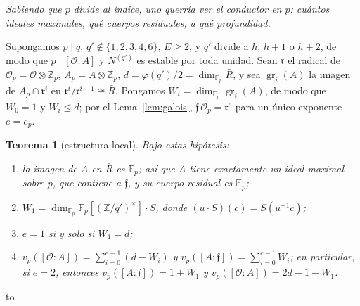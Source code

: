 \documentclass[11pt,a4paper]{article}
\newtheorem{theorem}{Teorema}
\theoremstyle{definition}
\newcommand{\ZZ}{\mathbb{Z}}
\newcommand{\FF}{\mathbb{F}}
\newcommand{\cO}{\mathcal{O}}
\newcommand{\cf}{\mathfrak{f}}
\newcommand{\rad}{\mathfrak{r}}
\newcommand{\gr}{\operatorname{gr}}
\newcommand{\pregunta}[1]{\par\smallskip\noindent\emph{#1}\par\smallskip}
\newenvironment{keybox}
  {\par\vspace{9pt}\begin{lrbox}{\fichabox}%
   \begin{minipage}{0.90\textwidth}\vspace{7pt}\setlength{\parskip}{3pt}}
  {\vspace{7pt}\end{minipage}\end{lrbox}%
   \par\needspace{\dimexpr\ht\fichabox+\dp\fichabox+12pt\relax}\noindent\hbox to \textwidth{\hfill
   \textcolor{azul}{\rule[-\dp\fichabox]{3.2pt}{\dimexpr\ht\fichabox+\dp\fichabox\relax}}%
   \colorbox{fondoficha}{\usebox{\fichabox}}\hfill}%
   \par\vspace{9pt}}
\begin{document}
\pregunta{Sabiendo que $p$ divide al índice, uno querría ver el conductor en $p$: cuántos ideales maximales, qué
cuerpos residuales, a qué profundidad.}

\noindent Supongamos $p\mid q$, $q'\notin\{1,2,3,4,6\}$, $E\ge2$, y $q'$ divide a $h$, $h+1$ o $h+2$, de modo que $p\mid[\cO:A]$ y
$N^{(q')}$ es estable por toda unidad. Sean $\rad$ el radical de $\cO_p=\cO\otimes\ZZ_p$, $A_p=A\otimes\ZZ_p$,
$d=\varphi(q')/2=\dim_{\FF_p}\bar R$, y sea $\gr_i(A)$ la imagen de $A_p\cap\rad^i$ en
$\rad^i/\rad^{i+1}\cong\bar R$. Pongamos $W_i=\dim_{\FF_p}\gr_i(A)$, de modo que $W_0=1$ y $W_i\le d$; por el
Lema~\ref{lem:galois}, $\cf\,\cO_p=\rad^{e}$ para un único exponente $e=e_p$.

\begin{keybox}
\begin{theorem}[estructura local]\label{thm:loc}
Bajo estas hipótesis:
\begin{enumerate}
\item[(a)] la imagen de $A$ en $\bar R$ es $\FF_p$; así que $A$ tiene exactamente un ideal maximal sobre $p$, que
 contiene a $\cf$, y su cuerpo residual es $\FF_p$;
\item[(b)] $W_1=\dim_{\FF_p}\FF_p[(\ZZ/q')^\times]\cdot S$, donde $(u\cdot S)(c)=S(u^{-1}c)$;
\item[(c)] $e=1$ si y solo si $W_1=d$;
\item[(d)] $v_p([\cO:A])=\sum_{i=0}^{e-1}(d-W_i)$ y $v_p([A:\cf])=\sum_{i=0}^{e-1}W_i$; en particular, si $e=2$,
 entonces $v_p([A:\cf])=1+W_1$ y $v_p([\cO:A])=2d-1-W_1$.
\end{enumerate}
\end{theorem}
\end{keybox}
\end{document}
